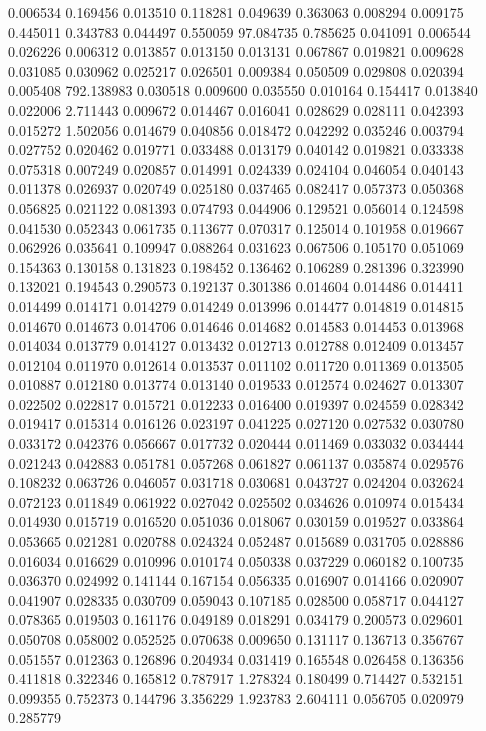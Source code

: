 0.006534
0.169456
0.013510
0.118281
0.049639
0.363063
0.008294
0.009175
0.445011
0.343783
0.044497
0.550059
97.084735
0.785625
0.041091
0.006544
0.026226
0.006312
0.013857
0.013150
0.013131
0.067867
0.019821
0.009628
0.031085
0.030962
0.025217
0.026501
0.009384
0.050509
0.029808
0.020394
0.005408
792.138983
0.030518
0.009600
0.035550
0.010164
0.154417
0.013840
0.022006
2.711443
0.009672
0.014467
0.016041
0.028629
0.028111
0.042393
0.015272
1.502056
0.014679
0.040856
0.018472
0.042292
0.035246
0.003794
0.027752
0.020462
0.019771
0.033488
0.013179
0.040142
0.019821
0.033338
0.075318
0.007249
0.020857
0.014991
0.024339
0.024104
0.046054
0.040143
0.011378
0.026937
0.020749
0.025180
0.037465
0.082417
0.057373
0.050368
0.056825
0.021122
0.081393
0.074793
0.044906
0.129521
0.056014
0.124598
0.041530
0.052343
0.061735
0.113677
0.070317
0.125014
0.101958
0.019667
0.062926
0.035641
0.109947
0.088264
0.031623
0.067506
0.105170
0.051069
0.154363
0.130158
0.131823
0.198452
0.136462
0.106289
0.281396
0.323990
0.132021
0.194543
0.290573
0.192137
0.301386
0.014604
0.014486
0.014411
0.014499
0.014171
0.014279
0.014249
0.013996
0.014477
0.014819
0.014815
0.014670
0.014673
0.014706
0.014646
0.014682
0.014583
0.014453
0.013968
0.014034
0.013779
0.014127
0.013432
0.012713
0.012788
0.012409
0.013457
0.012104
0.011970
0.012614
0.013537
0.011102
0.011720
0.011369
0.013505
0.010887
0.012180
0.013774
0.013140
0.019533
0.012574
0.024627
0.013307
0.022502
0.022817
0.015721
0.012233
0.016400
0.019397
0.024559
0.028342
0.019417
0.015314
0.016126
0.023197
0.041225
0.027120
0.027532
0.030780
0.033172
0.042376
0.056667
0.017732
0.020444
0.011469
0.033032
0.034444
0.021243
0.042883
0.051781
0.057268
0.061827
0.061137
0.035874
0.029576
0.108232
0.063726
0.046057
0.031718
0.030681
0.043727
0.024204
0.032624
0.072123
0.011849
0.061922
0.027042
0.025502
0.034626
0.010974
0.015434
0.014930
0.015719
0.016520
0.051036
0.018067
0.030159
0.019527
0.033864
0.053665
0.021281
0.020788
0.024324
0.052487
0.015689
0.031705
0.028886
0.016034
0.016629
0.010996
0.010174
0.050338
0.037229
0.060182
0.100735
0.036370
0.024992
0.141144
0.167154
0.056335
0.016907
0.014166
0.020907
0.041907
0.028335
0.030709
0.059043
0.107185
0.028500
0.058717
0.044127
0.078365
0.019503
0.161176
0.049189
0.018291
0.034179
0.200573
0.029601
0.050708
0.058002
0.052525
0.070638
0.009650
0.131117
0.136713
0.356767
0.051557
0.012363
0.126896
0.204934
0.031419
0.165548
0.026458
0.136356
0.411818
0.322346
0.165812
0.787917
1.278324
0.180499
0.714427
0.532151
0.099355
0.752373
0.144796
3.356229
1.923783
2.604111
0.056705
0.020979
0.285779
